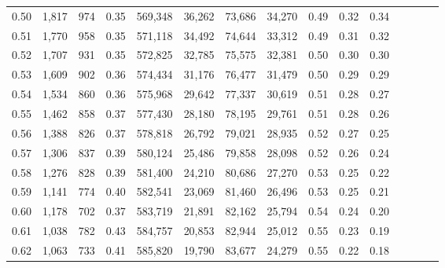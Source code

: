 \begin{tabular}{rrrcrrrrrrrrrrr}
0.50 &   1,817 &    974 &                                       0.35 &  569,348 &   36,262 &   73,686 &   34,270 &  0.49 &  0.32 &                         0.34 \\
0.51 &   1,770 &    958 &                                       0.35 &  571,118 &   34,492 &   74,644 &   33,312 &  0.49 &  0.31 &                         0.32 \\
0.52 &   1,707 &    931 &                                       0.35 &  572,825 &   32,785 &   75,575 &   32,381 &  0.50 &  0.30 &                         0.30 \\
0.53 &   1,609 &    902 &                                       0.36 &  574,434 &   31,176 &   76,477 &   31,479 &  0.50 &  0.29 &                         0.29 \\
0.54 &   1,534 &    860 &                                       0.36 &  575,968 &   29,642 &   77,337 &   30,619 &  0.51 &  0.28 &                         0.27 \\
0.55 &   1,462 &    858 &                                       0.37 &  577,430 &   28,180 &   78,195 &   29,761 &  0.51 &  0.28 &                         0.26 \\
0.56 &   1,388 &    826 &                                       0.37 &  578,818 &   26,792 &   79,021 &   28,935 &  0.52 &  0.27 &                         0.25 \\
0.57 &   1,306 &    837 &                                       0.39 &  580,124 &   25,486 &   79,858 &   28,098 &  0.52 &  0.26 &                         0.24 \\
0.58 &   1,276 &    828 &                                       0.39 &  581,400 &   24,210 &   80,686 &   27,270 &  0.53 &  0.25 &                         0.22 \\
0.59 &   1,141 &    774 &                                       0.40 &  582,541 &   23,069 &   81,460 &   26,496 &  0.53 &  0.25 &                         0.21 \\
0.60 &   1,178 &    702 &                                       0.37 &  583,719 &   21,891 &   82,162 &   25,794 &  0.54 &  0.24 &                         0.20 \\
0.61 &   1,038 &    782 &                                       0.43 &  584,757 &   20,853 &   82,944 &   25,012 &  0.55 &  0.23 &                         0.19 \\
0.62 &   1,063 &    733 &                                       0.41 &  585,820 &   19,790 &   83,677 &   24,279 &  0.55 &  0.22 &                         0.18 \\

\end{tabular}

